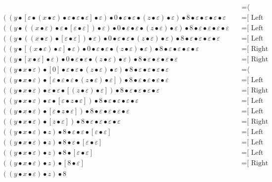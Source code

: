 \documentclass{article}
\begin{document}
\begin{align*}
  & \quad \text{=⟨ Evaluate ]}\\
((y • [ε • (x • ε) • ε • ε • ε] • ε) • 0 • ε • ε • (z • ε) • ε) • 8 • ε • ε • ε • ε
  & \quad \text{=[ Left neutrality ⟩}\\
((y • ((x • ε) • ε • [ε • ε]) • ε) • 0 • ε • ε • (z • ε) • ε) • 8 • ε • ε • ε • ε
  & \quad \text{=[ Left neutrality ⟩}\\
((y • ((x • ε) • [ε • ε]) • ε) • 0 • ε • ε • (z • ε) • ε) • 8 • ε • ε • ε • ε
  & \quad \text{=[ Left neutrality ⟩}\\
((y • [(x • ε) • ε] • ε) • 0 • ε • ε • (z • ε) • ε) • 8 • ε • ε • ε • ε
  & \quad \text{=[ Right neutrality ⟩}\\
((y • [x • ε] • ε) • 0 • ε • ε • (z • ε) • ε) • 8 • ε • ε • ε • ε
  & \quad \text{=[ Right neutrality ⟩}\\
((y • x • ε) • [0] • ε • ε • (z • ε) • ε) • 8 • ε • ε • ε • ε
  & \quad \text{=⟨ Evaluate ]}\\
((y • x • ε) • [ε • ε • ε • (z • ε) • ε]) • 8 • ε • ε • ε • ε
  & \quad \text{=[ Left neutrality ⟩}\\
((y • x • ε) • ε • ε • [(z • ε) • ε]) • 8 • ε • ε • ε • ε
  & \quad \text{=[ Right neutrality ⟩}\\
((y • x • ε) • ε • [ε • z • ε]) • 8 • ε • ε • ε • ε
  & \quad \text{=[ Left neutrality ⟩}\\
((y • x • ε) • [ε • z • ε]) • 8 • ε • ε • ε • ε
  & \quad \text{=[ Left neutrality ⟩}\\
((y • x • ε) • [z • ε]) • 8 • ε • ε • ε • ε
  & \quad \text{=[ Right neutrality ⟩}\\
((y • x • ε) • z) • 8 • ε • ε • [ε • ε]
  & \quad \text{=[ Left neutrality ⟩}\\
((y • x • ε) • z) • 8 • ε • [ε • ε]
  & \quad \text{=[ Left neutrality ⟩}\\
((y • x • ε) • z) • 8 • [ε • ε]
  & \quad \text{=[ Left neutrality ⟩}\\
((y • x • ε) • z) • [8 • ε]
  & \quad \text{=[ Right neutrality ⟩}\\
((y • x • ε) • z) • 8
\end{align*}
\end{document}
